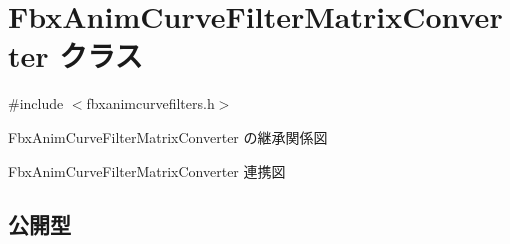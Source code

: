 \hypertarget{class_fbx_anim_curve_filter_matrix_converter}{}\section{Fbx\+Anim\+Curve\+Filter\+Matrix\+Converter クラス}
\label{class_fbx_anim_curve_filter_matrix_converter}


{\ttfamily \#include $<$fbxanimcurvefilters.\+h$>$}



Fbx\+Anim\+Curve\+Filter\+Matrix\+Converter の継承関係図


Fbx\+Anim\+Curve\+Filter\+Matrix\+Converter 連携図
\subsection*{公開型}
